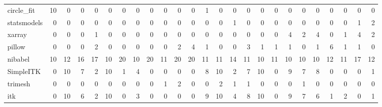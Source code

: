 \begin{tabular}{lrrrrrrrrrrrrrrrrrrrrrrrr}
circle\_fit & 10 & 0 & 0 & 0 & 0 & 0 & 0 & 0 & 0 & 0 & 0 & 1 & 0 & 0 & 0 & 0 & 0 & 0 & 0 & 0 & 0 & 0 & 0 & 0 \\
statsmodels & 0 & 0 & 0 & 0 & 0 & 0 & 0 & 0 & 0 & 0 & 0 & 0 & 0 & 1 & 0 & 0 & 0 & 0 & 0 & 0 & 0 & 0 & 1 & 2 \\
xarray & 0 & 0 & 0 & 1 & 0 & 0 & 0 & 0 & 0 & 0 & 0 & 0 & 0 & 0 & 0 & 0 & 0 & 4 & 2 & 4 & 0 & 1 & 4 & 2 \\
pillow & 0 & 0 & 0 & 2 & 0 & 0 & 0 & 0 & 0 & 2 & 4 & 1 & 0 & 0 & 3 & 1 & 1 & 1 & 0 & 1 & 6 & 1 & 1 & 0 \\
nibabel & 10 & 12 & 16 & 17 & 10 & 20 & 10 & 20 & 11 & 20 & 20 & 11 & 11 & 14 & 11 & 10 & 11 & 10 & 10 & 10 & 12 & 11 & 17 & 12 \\
SimpleITK & 0 & 10 & 7 & 2 & 10 & 1 & 4 & 0 & 0 & 0 & 0 & 8 & 10 & 2 & 7 & 10 & 0 & 9 & 7 & 8 & 0 & 0 & 0 & 1 \\
trimesh & 0 & 0 & 0 & 0 & 0 & 0 & 0 & 0 & 1 & 2 & 0 & 0 & 2 & 1 & 1 & 0 & 0 & 0 & 1 & 0 & 0 & 0 & 0 & 0 \\
itk & 0 & 10 & 6 & 2 & 10 & 0 & 3 & 0 & 0 & 0 & 0 & 9 & 10 & 4 & 8 & 10 & 0 & 9 & 7 & 6 & 1 & 2 & 0 & 1 \\
\bottomrule
\end{tabular}
